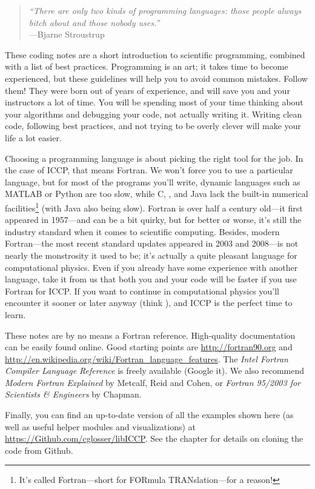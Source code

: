 \label{chap:Introduction}

\begin{quote}\small
\emph{``There are only two kinds of programming languages: those people always bitch about and those nobody uses.''} \\ \hspace*{\fill}---Bjarne Stroustrup
\end{quote}
These coding notes are a short introduction to scientific programming, combined with a list of best practices.
Programming is an art; it takes time to become experienced, but these guidelines will help you to avoid common mistakes.
Follow them! They were born out of years of experience, and will save you and your instructors a lot of time.
You will be spending most of your time thinking about your algorithms and debugging your code, not actually writing it.
Writing clean code, following best practices, and not trying to be overly clever will make your life a lot easier.

Choosing a programming language is about picking the right tool for the job.
In the case of ICCP, that means Fortran.
We won't force you to use a particular language, but for most of the programs you'll write, dynamic languages such as MATLAB or Python are too slow, while C, \Cplusplus, and Java lack the built-in numerical facilities\footnote{It's called Fortran---short for FORmula TRANslation---for a reason!} (with Java also being slow).
Fortran is over half a century old---it first appeared in 1957---and can be a bit quirky, but for better or worse, it's still the industry standard when it comes to scientific computing.
Besides, modern Fortran---the most recent standard updates appeared in 2003 and 2008---is not nearly the monstrosity it used to be; it's actually a quite pleasant language for computational physics.
Even if you already have some experience with another language, take it from us that both you and your code will be faster if you use Fortran for ICCP.
If you want to continue in computational physics you'll encounter it sooner or later anyway (think ), and ICCP is the perfect time to learn.

These notes are by no means a Fortran reference.
High-quality documentation can be easily found online.
Good starting points are \url{http://fortran90.org} and \url{http://en.wikipedia.org/wiki/Fortran_language_features}.
The \emph{Intel Fortran Compiler Language Reference} is freely available (Google it).
We also recommend \emph{Modern Fortran Explained} by Metcalf, Reid and Cohen, or \emph{Fortran 95/2003 for Scientists \& Engineers} by Chapman.

Finally, you can find an up-to-date version of all the examples shown here (as well as useful helper modules and visualizations) at \url{https://Github.com/cglosser/libICCP}.
See the  chapter for details on cloning the code from Github.
